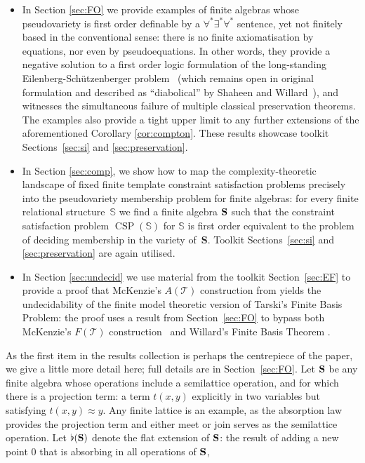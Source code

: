 \documentclass[reqno]{amsart}
\theoremstyle{plain}
\theoremstyle{definition}
\newcommand{\CSP}{\operatorname{CSP}}
\begin{document}
\begin{itemize}
\item In Section \ref{sec:FO} we provide examples of finite algebras whose pseudovariety is first order definable by a $\forall^*\exists^*\forall^*$ sentence, yet not finitely based in the conventional sense: there is no finite axiomatisation by equations, nor even by pseudoequations.  
In other words, they provide a negative solution to a first order logic formulation of the long-standing Eilenberg-Sch\"utzenberger problem~\cite{eilsch} (which remains open in original formulation and described as ``diabolical'' by Shaheen and Willard~\cite{shawil}), and witnesses the simultaneous failure of multiple classical preservation theorems.  
The examples also provide a tight upper limit to any further extensions of the aforementioned Corollary \ref{cor:compton}.  
These results showcase toolkit Sections~\ref{sec:si} and \ref{sec:preservation}.
\item In Section \ref{sec:comp}, we show how to map the complexity-theoretic landscape of fixed finite template constraint satisfaction problems precisely into the pseudovariety membership problem for finite algebras: for every finite relational structure~$\mathbb{S}$ we find a finite algebra ${\bf S}$ such that the constraint satisfaction problem $\CSP(\mathbb{S})$ for $\mathbb{S}$ is first order equivalent to the  problem of deciding membership in the variety of~$\mathbf{S}$.  
Toolkit Sections~\ref{sec:si} and \ref{sec:preservation} are again utilised.
\item In Section \ref{sec:undecid} we use material from the toolkit Section~\ref{sec:EF} to provide a proof that McKenzie's $A(\mathcal{T})$ construction from \cite{mck2} yields the undecidability of the finite model theoretic version of Tarski's Finite Basis Problem: the proof uses a result from Section~\ref{sec:FO} to bypass both McKenzie's $F(\mathcal{T})$ construction~\cite{mck3} and Willard's Finite Basis Theorem \cite{wil2}.
\end{itemize}
As the first item in the results collection is perhaps the centrepiece of the paper, we give a little more detail here; full details are in Section~\ref{sec:FO}.
Let ${\bf S}$ be any finite algebra whose operations include a semilattice operation, and for which there is a projection term: a term $t(x,y)$ explicitly in two variables but satisfying $t(x,y)\approx y$.  
Any finite lattice is an example, as the absorption law provides the projection term and either meet or join serves as the semilattice operation.
Let $\flat({\bf S})$ denote the flat extension of ${\bf S}$: the result of adding a new point $0$ that is absorbing in all operations of ${\bf S}$, 
\end{document}

